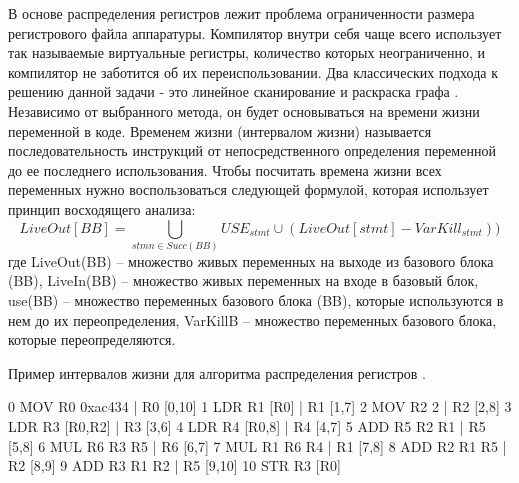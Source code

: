 В основе распределения регистров лежит проблема  ограниченности размера регистрового файла аппаратуры. Компилятор внутри себя чаще всего использует так называемые виртуальные регистры, количество которых неограниченно, и компилятор не заботится об их переиспользовании. Два классических подхода к решению данной задачи - это линейное сканирование \cite{poletto1999linear, subha2009modified} и раскраска графа \cite{smith2004generalized, briggs1992register}. 
Независимо от выбранного метода, он будет основываться на времени жизни переменной в коде. Временем жизни (интервалом жизни) называется последовательность инструкций от непосредственного определения переменной до ее последнего использования. Чтобы посчитать времена жизни всех переменных нужно воспользоваться следующей формулой, которая использует принцип восходящего анализа:
$$LiveOut[BB] = \bigcup_{stmn \in Succ(BB)}{USE_{stmt} \cup (LiveOut[stmt] - VarKill_{stmt}))}$$
где LiveOut(BB) – множество живых переменных на выходе из базового блока (BB),
LiveIn(BB) – множество живых переменных  на входе в базовый блок,
use(BB) – множество переменных базового блока (BB), которые используются
в нем до их переопределения,
VarKillB – множество переменных базового блока, которые
переопределяются.

\begin{ListingEnv}[!h]
	\captiondelim{ } 
	\caption{Пример интервалов жизни для алгоритма распределения регистров \cite{melnik2010case}.}\label{partReview:regalloc5}
	
	\begin{Verb}
		0 MOV R0 0xac434   | R0 [0,10]
		1 LDR R1 [R0]      | R1 [1,7]
		2 MOV R2 2         | R2 [2,8]
		3 LDR R3 [R0,R2]   | R3 [3,6]
		4 LDR R4 [R0,8]    | R4 [4,7]
		5 ADD R5 R2 R1     | R5 [5,8]
		6 MUL R6 R3 R5     | R6 [6,7]
		7 MUL R1 R6 R4     | R1 [7,8]
		8 ADD R2 R1 R5     | R2 [8,9]
		9 ADD R3 R1 R2     | R5 [9,10]
		10 STR R3 [R0]     
	\end{Verb}
\end{ListingEnv}

